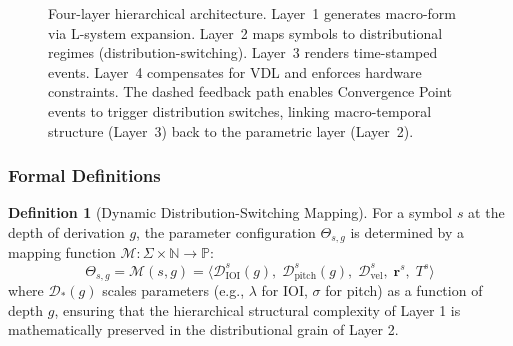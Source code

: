 \documentclass[a4paper]{article}
\theoremstyle{definition}
\newtheorem{definition}{Definition}
\theoremstyle{remark}
\begin{document}
\begin{figure}[htbp]
\caption{Four-layer hierarchical architecture. Layer~1 generates macro-form via L-system expansion. Layer~2 maps symbols to distributional regimes (distribution-switching). Layer~3 renders time-stamped events. Layer~4 compensates for VDL and enforces hardware constraints. The dashed feedback path enables Convergence Point events to trigger distribution switches, linking macro-temporal structure (Layer~3) back to the parametric layer (Layer~2).}
\label{fig:architecture}
\end{figure}

\subsubsection{Formal Definitions}

\begin{definition}[Dynamic Distribution-Switching Mapping]
For a symbol $s$ at the depth of derivation $g$, the parameter configuration $\Theta_{s,g}$ is determined by a mapping function $\mathcal{M}: \Sigma \times \mathbb{N} \rightarrow \mathbb{P}$:
\begin{equation}
    \Theta_{s,g} = \mathcal{M}(s, g) = \langle \mathcal{D}_{\text{IOI}}^{s}(g), \; \mathcal{D}_{\text{pitch}}^{s}(g), \; \mathcal{D}_{\text{vel}}^{s}, \; \mathbf{r}^s, \; T^s \rangle
\end{equation}
where $\mathcal{D}_*(g)$ scales parameters (e.g., $\lambda$ for IOI, $\sigma$ for pitch) as a function of depth $g$, ensuring that the hierarchical structural complexity of Layer 1 is mathematically preserved in the distributional grain of Layer 2.
\end{definition}
\end{document}
